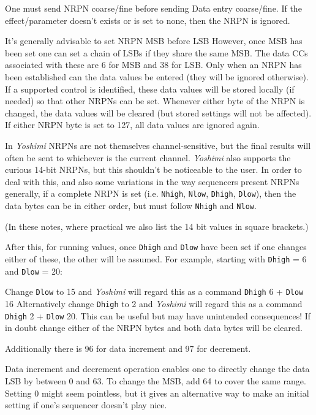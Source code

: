   One must send NRPN coarse/fine before sending Data entry coarse/fine.  If
   the effect/parameter doesn't exists or is set to none, then the NRPN is
   ignored.

   It's generally advisable to set NRPN MSB before LSB However, once MSB has
   been set one can set a chain of LSBs if they share the same MSB.
   The data CCs associated with these are 6 for MSB and 38 for LSB.
   Only when an NRPN has been established can the data values be entered
   (they will be ignored otherwise).
   If a supported control is identified, these data values will be stored
   locally (if needed) so that other NRPNs can be set.
   Whenever either byte of the NRPN is changed, the data values will be
   cleared (but stored settings will not be affected).
   If either NRPN byte is set to 127, all data values are ignored again.

   In \textsl{Yoshimi} NRPNs are not themselves channel-sensitive, but the
   final results will often be sent to whichever is the current channel.
   \textsl{Yoshimi} also supports the curious 14-bit NRPNs, but this shouldn't
   be noticeable to the user. In order to deal with this, and also some
   variations in the way sequencers present NRPNs generally, if a complete
   NRPN is set
   (i.e. \texttt{Nhigh}, \texttt{Nlow}, \texttt{Dhigh}, \texttt{Dlow}),
   then the data bytes can be in
   either order, but must follow \texttt{Nhigh} and \texttt{Nlow}.

   (In these notes, where practical we also list the 14 bit values in square
   brackets.)

   After this, for running values, once
   \texttt{Dhigh} and \texttt{Dlow} have been set if one
   changes either of these, the other will be assumed.
   For example, starting with \texttt{Dhigh} = 6 and \texttt{Dlow} = 20:

   Change \texttt{Dlow} to 15 and \textsl{Yoshimi} will regard this as a
   command \texttt{Dhigh} 6 + \texttt{Dlow} 16 Alternatively change
   \texttt{Dhigh} to 2 and \textsl{Yoshimi} will regard this as a
   command \texttt{Dhigh} 2 + \texttt{Dlow} 20.
   This can be useful but may have unintended consequences!
   If in doubt change either of the NRPN bytes and both data bytes will be
   cleared.

   Additionally there is 96 for data increment and 97 for decrement.

   Data increment and decrement operation enables one to directly change the
   data LSB by between 0 and 63. To change the MSB, add 64 to cover the same
   range. Setting 0 might seem pointless, but it gives an alternative way
   to make an initial setting if one's sequencer doesn't play nice.

